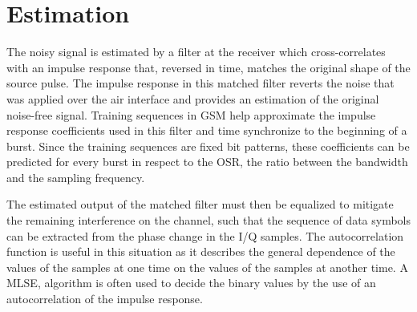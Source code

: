 \section{Estimation}
The noisy signal is estimated by a filter at the receiver which
cross-correlates with an impulse response that, reversed in time,
matches the original shape of the source pulse. The impulse response
in this matched filter reverts the noise that was applied over the air
interface and provides an estimation of the original noise-free
signal. Training sequences in \gls{GSM} help approximate the impulse
response coefficients used in this filter and time synchronize to the
beginning of a burst. Since the training sequences are fixed bit
patterns, these coefficients can be predicted for every burst in
respect to the \gls{OSR}, the ratio between the bandwidth and the
sampling frequency.

The estimated output of the matched filter must then be equalized to
mitigate the remaining interference on the channel, such that the
sequence of data symbols can be extracted from the phase change in the
\gls{I}/\gls{Q} samples. The autocorrelation function is useful in
this situation as it describes the general dependence of the values of
the samples at one time on the values of the samples at another
time. A \gls{MLSE}, algorithm is often used to decide the binary
values by the use of an autocorrelation of the impulse response.

